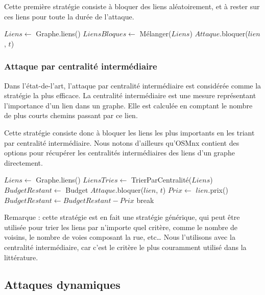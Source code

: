 Cette première stratégie consiste à bloquer des liens aléatoirement, et à rester sur ces liens pour toute la durée de l'attaque.
\begin{algorithm}[H]
\caption{Attaque aléatoire statique}
\begin{algorithmic}
\State $Liens \gets$ Graphe.liens()
\State $LiensBloques \gets$ Mélanger($Liens$)
\State $Attaque$.bloquer($lien$, $t$)
\EndFor
\end{algorithmic}
\end{algorithm}

\subsubsection{Attaque par centralité intermédiaire}\label{subsubsec:attaque_centralite_intermediaire}

Dans l'état-de-l'art, l'attaque par centralité intermédiaire est considérée comme la stratégie la plus efficace.
La centralité intermédiaire est une mesure représentant l'importance d'un lien dans un graphe.
Elle est calculée en comptant le nombre de plus courts chemins passant par ce lien.

Cette stratégie consiste donc à bloquer les liens les plus importants en les triant par centralité intermédiaire.
Nous notons d'ailleurs qu'OSMnx contient des options pour récupérer les centralités intermédiaires des liens d'un graphe directement.
\begin{algorithm}[H]
\caption{Attaque par centralité intermédiaire}
\begin{algorithmic}
\State $Liens \gets$ Graphe.liens()
\State $LiensTries \gets$ TrierParCentralité($Liens$)
\State $BudgetRestant \gets$ Budget
\State $Attaque$.bloquer($lien$, $t$)
\State $Prix \gets$ $lien$.prix()
\State $BudgetRestant \gets BudgetRestant - Prix$
\State break
\EndIf
\EndFor
\EndFor
\end{algorithmic}
\end{algorithm}

Remarque : cette stratégie est en fait une stratégie générique, qui peut être utilisée pour trier les liens par n'importe quel critère, comme le nombre de voisins, le nombre de voies composant la rue, etc\dots
Nous l'utilisons avec la centralité intermédiaire, car c'est le critère le plus couramment utilisé dans la littérature.

\subsection{Attaques dynamiques}\label{subsec:attaques_dynamiques}

